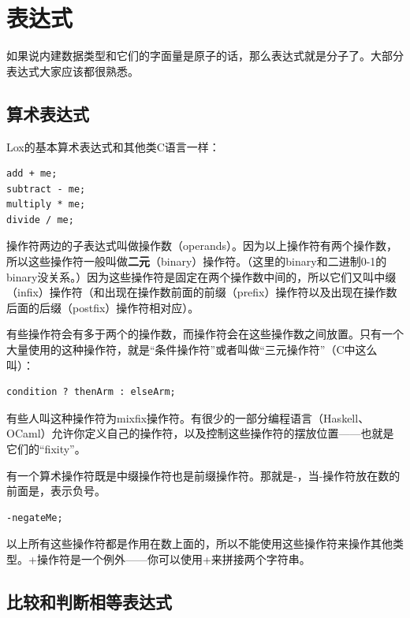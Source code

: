 \documentclass[cn,10pt,math=newtx,citestyle=gb7714-2015,bibstyle=gb7714-2015]{elegantbook}
\begin{document}
\section{表达式}

如果说内建数据类型和它们的字面量是原子的话，那么表达式就是分子了。大部分表达式大家应该都很熟悉。

\subsection{算术表达式}

Lox的基本算术表达式和其他类C语言一样：

\begin{verbatim}
add + me;
subtract - me;
multiply * me;
divide / me;
\end{verbatim}

操作符两边的子表达式叫做操作数（operands）。因为以上操作符有两个操作数，所以这些操作符一般叫做\textbf{二元}（binary）操作符。（这里的binary和二进制0-1的binary没关系。）因为这些操作符是固定在两个操作数中间的，所以它们又叫中缀（infix）操作符（和出现在操作数前面的前缀（prefix）操作符以及出现在操作数后面的后缀（postfix）操作符相对应）。

\begin{tcolorbox}
有些操作符会有多于两个的操作数，而操作符会在这些操作数之间放置。只有一个大量使用的这种操作符，就是“条件操作符”或者叫做“三元操作符”（C中这么叫）：

\begin{verbatim}
condition ? thenArm : elseArm;
\end{verbatim}

有些人叫这种操作符为mixfix操作符。有很少的一部分编程语言（Haskell、OCaml）允许你定义自己的操作符，以及控制这些操作符的摆放位置——也就是它们的“fixity”。
\end{tcolorbox}

有一个算术操作符既是中缀操作符也是前缀操作符。那就是-，当-操作符放在数的前面是，表示负号。

\begin{verbatim}
-negateMe;
\end{verbatim}

以上所有这些操作符都是作用在数上面的，所以不能使用这些操作符来操作其他类型。+操作符是一个例外——你可以使用+来拼接两个字符串。

\subsection{比较和判断相等表达式}
\end{document}

